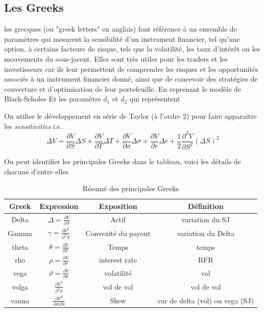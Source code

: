 \documentclass[a4paper]{article}
\begin{document}
\subsection{Les Greeks}

 les grecques (ou "greek letters" en anglais) font référence à un ensemble de paramètres qui mesurent la sensibilité d'un instrument financier, tel qu'une option, à certains facteurs de risque, tels que la volatilité, les taux d'intérêt ou les mouvements du sous-jacent. Elles sont très utiles pour les traders et les investisseurs car ils leur permettent de comprendre les risques et les opportunités associés à un instrument financier donné, ainsi que de concevoir des stratégies de couverture et d'optimisation de leur portefeuille. En reprenant le modèle de Black-Scholes
 Et les paramètre $d_1$ et $d_2$ qui représentent

 On utilise le développement en série de Taylor (à l'ordre 2) pour faire apparaitre les \textit{sensitivities} i.e.
 \begin{equation}
     \Delta V = \frac{\partial V}{\partial S} \Delta S + \frac{\partial V}{\partial T} \Delta T + \frac{\partial V}{\partial \sigma} \Delta \sigma + \frac{\partial V}{\partial r} \Delta r + \frac{1}{2}\frac{\partial^2 V}{\partial S ^2} (\Delta S)^2
 \end{equation}

On peut identifier les principales Greeks dans le tableau, voici les détails de chacune d'entre elles

\begin{table}[]
    \centering
 \begin{tabular}{|c||c|c|c|}
      \hline
     Greek & Expression & Exposition & Définition \\
     \hline
     Delta & $\Delta = \frac{\partial V}{\partial S}$ & Actif & variation du SJ \\
     \hline
     Gamma & $\gamma = \frac{\partial V^2}{\partial^2 S}$ & Convexité du payout & variation du Delta \\
     \hline
     theta & $\theta = \frac{\partial V}{\partial T}$ & Temps & temps \\
     \hline
     rho & $\rho = \frac{\partial V}{\partial r}$ & interest rate & RFR \\
     \hline
     vega & $ \vartheta = \frac{\partial V}{\partial \sigma}$ & volatilité &  vol \\
     \hline
     volga & $ \frac{\partial V^2}{\partial^2 \sigma}$ & vol de vol & vol de vol \\
     \hline
     vanna & $ \frac{\partial V^2}{\partial \sigma \partial S}$ & Skew & var de delta (vol) ou vega (SJ) \\
     \hline
 \end{tabular}
 \caption{Résumé des principales Greeks}
\label{tab:my_label}
\end{table}
\end{document}
